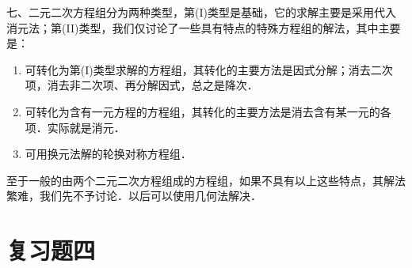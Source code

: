     七、二元二次方程组分为两种类型，第(I)类型是基础，它的求解主要是采用代入消元法；第(II)类型，我们仅讨论了一些具有特点的特殊方程组的解法，其中主要是：
    \begin{enumerate}
        \item 可转化为第(I)类型求解的方程组，其转化的主要方法是因式分解；消去二次项，消去非二次项、再分解因式，总之是降次．
        \item 可转化为含有一元方程的方程组，其转化的主要方法是消去含有某一元的各项．实际就是消元．
        \item 可用换元法解的轮换对称方程组．
\end{enumerate}

至于一般的由两个二元二次方程组成的方程组，如果不具有以上这些特点，其解法繁难，我们先不予讨论．以后可以使用几何法解决．


\section*{复习题四}
